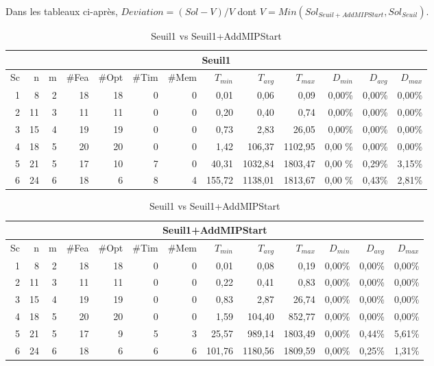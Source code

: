 \documentclass[twoside,fleqn]{EPURapport}
\begin{document}
Dans les tableaux ci-après, $Deviation = (Sol-V)/V$ dont $V =Min(Sol_{Seuil+AddMIPStart},Sol_{Seuil})$.

\begin{table}[h]
    \centering
    \begin{tabular}{|r|r|r|r|r|r|r|r|r|r|r|r|r|}
    	\hline
    	\multicolumn{13}{|c|}{Seuil1}\\ \hline
Sc &	n	&m	&\#Fea	&\#Opt	&\#Tim &\#Mem	&$T_{min}$ & $T_{avg}$	& $T_{max}$ & $D_{min}$ & $D_{avg}$	& $D_{max}$ \\ \hline
1&	8 &	2&	18&	18&	0&	0&	0,01&	0,06&	0,09	&0,00\%&	0,00\%&	0,00\%    \\ \hline
2&	11&	3&	11&	11&	0&	0&	0,20&	0,40&	0,74	&0,00\%&	0,00\%&	0,00\%     \\ \hline
3&	15&	4&	19&	19&	0&	0&	0,73&	2,83&	26,05	&0,00\%&	0,00\%&	0,00\%  \\ \hline
4 &	18	&5	&20	    &20	&0	&0	&1,42	&106,37	&1102,95	&0,00	\%&0,00\%&	0,00\% \\ \hline
5 &	21	&5	&17	    &10	&7	&0	&40,31	&1032,84&	1803,47	&0,00	\%&0,29\%&	3,15\% \\ \hline
6 &	24	&6	&18	    &6	&8	&4	&155,72	&1138,01&	1813,67	&0,00	\%&0,43\%&	2,81\% \\ \hline
    \end{tabular}
\vspace{2em}
    \begin{tabular}{|r|r|r|r|r|r|r|r|r|r|r|r|r|}
    	\hline
    	\multicolumn{13}{|c|}{Seuil1+AddMIPStart}\\ \hline
Sc &	n	&m	&\#Fea	&\#Opt	&\#Tim &\#Mem	&$T_{min}$ & $T_{avg}$	& $T_{max}$ & $D_{min}$ & $D_{avg}$	& $D_{max}$ \\ \hline
1&	8 &	2&	18&	18&	0&	0&	0,01&	0,08&	0,19	&0,00\%&	0,00\%&	0,00\%    \\ \hline
2&	11&	3&	11&	11&	0&	0&	0,22&	0,41&	0,83	&0,00\%&	0,00\%&	0,00\%     \\ \hline
3&	15&	4&	19&	19&	0&	0&	0,83&	2,87&	26,74	&0,00\%&	0,00\%&	0,00\%  \\ \hline
4 &	18	&5	&20	  &20	&0	&0	&1,59	&104,40	&852,77	    &0,00\%&	0,00\%&	0,00\% \\ \hline
5 &	21	&5	&17	  &9	&5	&3	&25,57	&989,14	&1803,49	&0,00\%&	0,44\%&	5,61\% \\ \hline
6 &	24	&6	&18	  &6	&6	&6	&101,76	&1180,56&	1809,59	&0,00\%&	0,25\%&	1,31\% \\ \hline

    \end{tabular}
    \caption{Seuil1 vs Seuil1+AddMIPStart}
    \label{tab_cut2_ams1_tab2}
\end{table}
\end{document}
